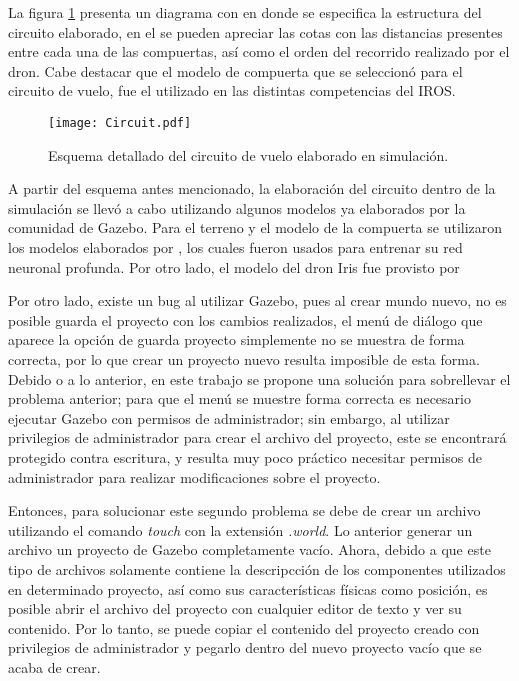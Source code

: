 La figura \ref{fig:Circuit} presenta un diagrama con en donde se especifica la estructura del circuito elaborado, en el se pueden apreciar las cotas con las distancias presentes entre cada una de las compuertas, así como el orden del recorrido realizado por el dron. Cabe destacar que el modelo de compuerta que se seleccionó para el circuito de vuelo, fue el utilizado en las distintas competencias del IROS.

\begin{figure}[ht]
    \centering
    \texttt{[image: Circuit.pdf]}
    \caption{Esquema detallado del circuito de vuelo elaborado en simulación.}
    \label{fig:Circuit}
\end{figure}

A partir del esquema antes mencionado, la elaboración del circuito dentro de la simulación se llevó a cabo utilizando algunos modelos ya elaborados por la comunidad de Gazebo. Para el terreno y el modelo de la compuerta se utilizaron los modelos elaborados por \cite{rojas2020deeppilot}, los cuales fueron usados para entrenar su red neuronal profunda. Por otro lado, el modelo del dron Iris fue provisto por

Por otro lado, existe un bug al utilizar Gazebo, pues al crear mundo nuevo, no es posible guarda el proyecto con los cambios realizados, el menú de diálogo que aparece la opción de guarda proyecto simplemente no se muestra de forma correcta, por lo que crear un proyecto nuevo resulta imposible de esta forma. Debido o a lo anterior, en este trabajo se propone una solución para sobrellevar el problema anterior; para que el menú se muestre forma correcta es necesario ejecutar Gazebo con permisos de administrador; sin embargo, al utilizar privilegios de administrador para crear el archivo del proyecto, este se encontrará protegido contra escritura, y resulta muy poco práctico necesitar permisos de administrador para realizar modificaciones sobre el proyecto.

Entonces, para solucionar este segundo problema se debe de crear un archivo utilizando el comando \textit{touch} con la extensión \textit{.world}. Lo anterior generar un archivo un proyecto de Gazebo completamente vacío. Ahora, debido a que este tipo de archivos solamente contiene la descripcción de los componentes utilizados en determinado proyecto, así como sus características físicas como posición, es posible abrir el archivo del proyecto con cualquier editor de texto y ver su contenido. Por lo tanto, se puede copiar el contenido del proyecto creado con privilegios de administrador y pegarlo dentro del nuevo proyecto vacío que se acaba de crear.

